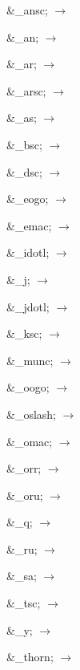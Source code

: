 \begin{multicols}{3}
\color{RViolet}%
\&{\textcompwordmark}\_ansc; $\rightarrow $

\&{\textcompwordmark}\_an; $\rightarrow $

\&{\textcompwordmark}\_ar; $\rightarrow $

\&{\textcompwordmark}\_arsc; $\rightarrow $

\&\_{\textcompwordmark}as; $\rightarrow $

\&{\textcompwordmark}\_bsc; $\rightarrow $

\&{\textcompwordmark}\_dsc; $\rightarrow $

\&{\textcompwordmark}\_eogo; $\rightarrow $

\&{\textcompwordmark}\_emac; $\rightarrow $

\&\_{\textcompwordmark}idotl; $\rightarrow $

\&\_{\textcompwordmark}j; $\rightarrow $

\&\_{\textcompwordmark}jdotl; $\rightarrow $

\&\_{\textcompwordmark}ksc; $\rightarrow $

{\narrow\&\_{\textcompwordmark}munc; $\rightarrow $
}

\&\_{\textcompwordmark}oogo; $\rightarrow $

{\narrow\&\_{\textcompwordmark}oslash; $\rightarrow $
}

\&\_{\textcompwordmark}omac; $\rightarrow $

\&\_{\textcompwordmark}orr; $\rightarrow $

\&\_{\textcompwordmark}oru; $\rightarrow $

\&\_{\textcompwordmark}q; $\rightarrow $

\&\_{\textcompwordmark}ru; $\rightarrow $

\&\_{\textcompwordmark}sa; $\rightarrow $

\&\_{\textcompwordmark}tsc; $\rightarrow $

\&\_{\textcompwordmark}y; $\rightarrow $

{\narrow\&\_{\textcompwordmark}thorn; $\rightarrow $
}
\end{multicols}

